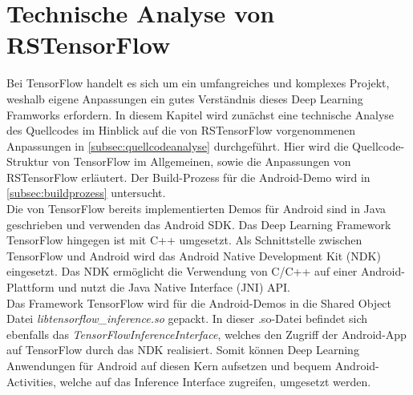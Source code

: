 \section{Technische Analyse von RSTensorFlow}
\label{sec:analyserstf}
Bei TensorFlow handelt es sich um ein umfangreiches und komplexes Projekt, weshalb eigene Anpassungen ein gutes Verständnis dieses Deep Learning Framworks erfordern. In diesem Kapitel wird zunächst eine technische Analyse des Quellcodes im Hinblick auf die von RSTensorFlow vorgenommenen Anpassungen in \ref{subsec:quellcodeanalyse} durchgeführt. Hier wird die Quellcode-Struktur von TensorFlow im Allgemeinen, sowie die Anpassungen von RSTensorFlow erläutert. Der Build-Prozess für die Android-Demo wird in \ref{subsec:buildprozess} untersucht. 
\\
Die von TensorFlow bereits implementierten Demos für Android sind in Java geschrieben und verwenden das Android SDK. Das Deep Learning Framework TensorFlow hingegen ist mit C++ umgesetzt. Als Schnittstelle zwischen TensorFlow und Android wird das Android Native Development Kit (NDK) eingesetzt. Das NDK ermöglicht die Verwendung von C/C++ auf einer Android-Plattform und nutzt die Java Native Interface (JNI) API. \\
Das Framework TensorFlow wird für die Android-Demos in die Shared Object Datei \textit{libtensorflow\_inference.so} gepackt. In dieser .so-Datei befindet sich ebenfalls das \textit{TensorFlowInferenceInterface}, welches den Zugriff der Android-App auf TensorFlow durch das NDK realisiert. Somit können Deep Learning Anwendungen für Android auf diesen Kern aufsetzen und bequem Android-Activities, welche auf das Inference Interface zugreifen, umgesetzt werden. 

